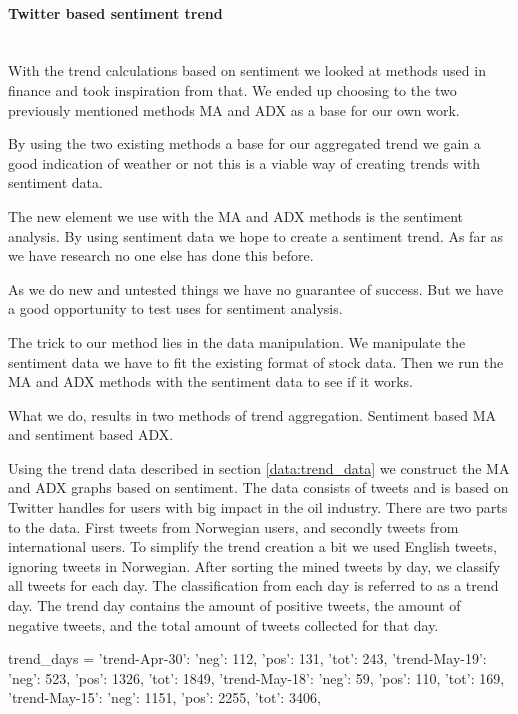 \paragraph{Twitter based sentiment trend} 
\hspace{0pt}\\
With the trend calculations based on sentiment we looked at methods used in
finance and took inspiration from that. We ended up choosing to the two
previously mentioned methods MA and ADX as a base for our own work. 

By using the two existing methods a base for our aggregated trend we gain a
good indication of weather or not this is a viable way of creating trends with sentiment data.

The new element we use with the MA and ADX methods is the sentiment analysis.
By using sentiment data we hope to create a sentiment trend. As far as we have
research no one else has done this before. 

As we do new and untested things we have no guarantee of success. But we have a
good opportunity to test uses for sentiment analysis. 

The trick to our method lies in the data manipulation. We manipulate the
sentiment data we have to fit the existing format of stock data. Then we run
the MA and ADX methods with the sentiment data to see if it works.  

What we do, results in two methods of trend aggregation. Sentiment based MA and
sentiment based ADX. 
 
Using the trend data described in section \ref{data:trend_data} we construct
the MA and ADX graphs based on sentiment. The data consists of tweets and is
based on Twitter handles for users with big impact in the oil industry. There
are two parts to the data. First tweets from Norwegian users, and secondly
tweets from international users. To simplify the trend creation a bit we used
English tweets, ignoring tweets in Norwegian. After sorting the mined tweets by
day, we classify all tweets for each day. The classification from each day is
referred to as a trend day. The trend day contains the amount of positive
tweets, the amount of negative tweets, and the total amount of tweets collected
for that day. 

\begin{python}
trend_days = {
	'trend-Apr-30': {'neg': 112, 'pos': 131, 'tot': 243},
    'trend-May-19': {'neg': 523, 'pos': 1326, 'tot': 1849},
    'trend-May-18': {'neg': 59, 'pos': 110, 'tot': 169},
    'trend-May-15': {'neg': 1151, 'pos': 2255, 'tot': 3406},
}
\end{python}  

